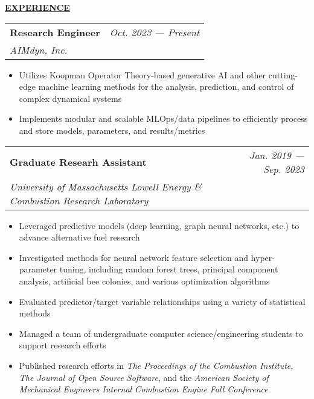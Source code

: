 \documentclass{letter}
\begin{document}
    \medskip \large \textbf{\underline{EXPERIENCE}} \medskip \normalsize

    \setlength\tabcolsep{0cm}
    \begin{tabular*}{\linewidth}{L r}
        \textbf{Research Engineer} & \textit{Oct. 2023 --- Present} \\
        \textit{AIMdyn, Inc.} & 
    \end{tabular*}

    \small
    \begin{itemize}[leftmargin=0.75cm]
        \setlength{\itemsep}{0pt}
        \item Utilizes Koopman Operator Theory-based generative AI and other cutting-edge machine learning methods for the analysis, prediction, and control of complex dynamical systems
        \item Implements modular and scalable MLOps/data pipelines to efficiently process and store models, parameters, and results/metrics
    \end{itemize}
    \normalsize

    \begin{tabular*}{\linewidth}{L r}
        \textbf{Graduate Researh Assistant} & \textit{Jan. 2019 --- Sep. 2023} \\
        \textit{University of Massachusetts Lowell Energy \& Combustion Research Laboratory} & 
    \end{tabular*}

    \small
    \begin{itemize}[leftmargin=0.75cm]
        \setlength{\itemsep}{0pt}
        \item Leveraged predictive models (deep learning, graph neural networks, etc.) to advance alternative fuel research
        \item Investigated methods for neural network feature selection and hyper-parameter tuning, including random forest trees, principal component analysis, artificial bee colonies, and various optimization algorithms
        \item Evaluated predictor/target variable relationships using a variety of statistical methods
        \item Managed a team of undergraduate computer science/engineering students to support research efforts
        \item Published research efforts in \textit{The Proceedings of the Combustion Institute}, \textit{The Journal of Open Source Software}, and the \textit{American Society of Mechanical Engineers Internal Combustion Engine Fall Conference}
    \end{itemize}
    \normalsize
\end{document}
